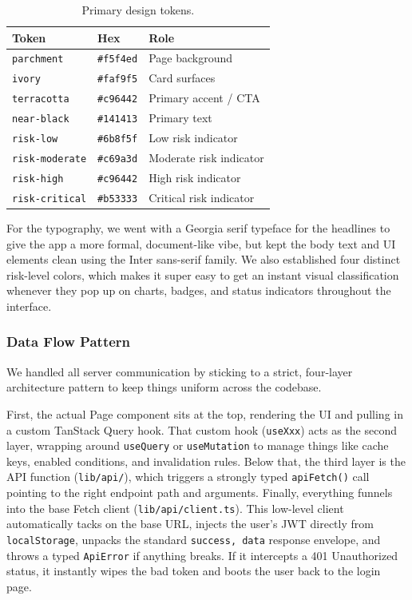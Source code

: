 \documentclass[12pt,a4paper]{article}
\begin{document}
\begin{table}[H]
  \centering
  \singlespacing
  \caption{Primary design tokens.}
  \label{tab:design-tokens}
  \begin{tabular}{@{}lll@{}}
    \toprule
    \textbf{Token} & \textbf{Hex} & \textbf{Role} \\
    \midrule
    \texttt{parchment}    & \texttt{\#f5f4ed} & Page background \\
    \texttt{ivory}        & \texttt{\#faf9f5} & Card surfaces \\
    \texttt{terracotta}   & \texttt{\#c96442} & Primary accent / CTA \\
    \texttt{near-black}   & \texttt{\#141413} & Primary text \\
    \texttt{risk-low}     & \texttt{\#6b8f5f} & Low risk indicator \\
    \texttt{risk-moderate} & \texttt{\#c69a3d} & Moderate risk indicator \\
    \texttt{risk-high}    & \texttt{\#c96442} & High risk indicator \\
    \texttt{risk-critical} & \texttt{\#b53333} & Critical risk indicator \\
    \bottomrule
  \end{tabular}
\end{table}

For the typography, we went with a Georgia serif typeface for the headlines to give the app a more formal, document-like vibe, but kept the body text and UI elements clean using the Inter sans-serif family. We also established four distinct risk-level colors, which makes it super easy to get an instant visual classification whenever they pop up on charts, badges, and status indicators throughout the interface.

\subsubsection{Data Flow Pattern}

We handled all server communication by sticking to a strict, four-layer architecture pattern to keep things uniform across the codebase.

First, the actual Page component sits at the top, rendering the UI and pulling in a custom TanStack Query hook. That custom hook (\texttt{useXxx}) acts as the second layer, wrapping around \texttt{useQuery} or \texttt{useMutation} to manage things like cache keys, enabled conditions, and invalidation rules. Below that, the third layer is the API function (\texttt{lib/api/}), which triggers a strongly typed \texttt{apiFetch()} call pointing to the right endpoint path and arguments. Finally, everything funnels into the base Fetch client (\texttt{lib/api/client.ts}). This low-level client automatically tacks on the base URL, injects the user's JWT directly from \texttt{localStorage}, unpacks the standard \texttt{{success, data}} response envelope, and throws a typed \texttt{ApiError} if anything breaks. If it intercepts a 401 Unauthorized status, it instantly wipes the bad token and boots the user back to the login page.
\end{document}
